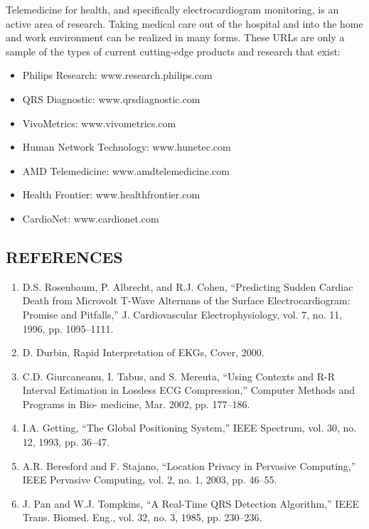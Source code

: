 \documentclass[a4paper,12pt]{article}
\begin{document}
Telemedicine for health, and specifically electrocardiogram monitoring, is an active area of research. Taking medical care out of the hospital and into the home and work environment can be realized in many forms. These URLs are only a sample of the types of current cutting-edge products and research that exist: 
\begin{itemize}
	\item Philips Research: www.research.philips.com
	\item QRS Diagnostic: www.qrsdiagnostic.com
	\item VivoMetrics: www.vivometrics.com
	\item Human Network Technology: www.hunetec.com
	\item AMD Telemedicine: www.amdtelemedicine.com
	\item Health Frontier: www.healthfrontier.com
	\item CardioNet: www.cardionet.com
\end{itemize}

\subsection{REFERENCES}


\begin{enumerate}
	\item D.S. Rosenbaum, P. Albrecht, and R.J. Cohen, “Predicting Sudden Cardiac Death 	from Microvolt T-Wave Alternans of the Surface Electrocardiogram: Promise and Pitfalls,” J. Cardiovascular Electrophysiology, vol. 7, no. 11, 1996, pp. 1095–1111.
	\item D. Durbin, Rapid Interpretation of EKGs, Cover, 2000.
	\item C.D. Giurcaneanu, I. Tabus, and S. Mereuta, “Using Contexts and R-R Interval Estimation in Lossless ECG Compression,” Computer Methods and Programs in Bio- medicine, Mar. 2002, pp. 177–186.
	\item I.A. Getting, “The Global Positioning System,” IEEE Spectrum, vol. 30, no. 12, 1993, pp. 36–47.
	\item A.R. Beresford and F. Stajano, “Location Privacy in Pervasive Computing,” IEEE Pervasive Computing, vol. 2, no. 1, 2003, pp. 46–55.
	\item J. Pan and W.J. Tompkins, “A Real-Time QRS Detection Algorithm,” IEEE Trans. Biomed. Eng., vol. 32, no. 3, 1985, pp. 230–236.
\end{enumerate}
\end{document}
